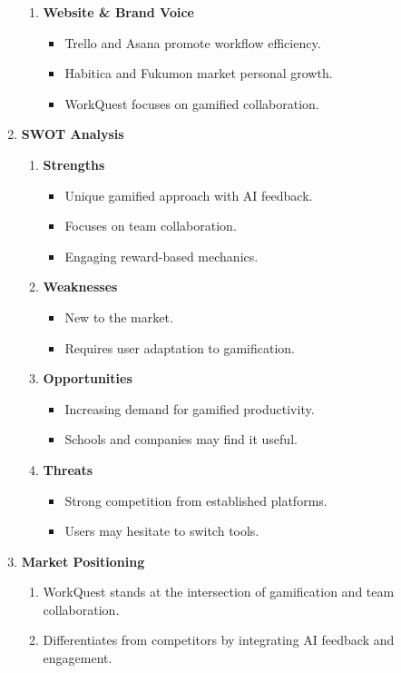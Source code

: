 \begin{enumerate}
\begin{enumerate}
        \item \textbf{Website \& Brand Voice}
        \begin{itemize}
            \item Trello and Asana promote workflow efficiency.
            \item Habitica and Fukumon market personal growth.
            \item WorkQuest focuses on gamified collaboration.
        \end{itemize}
    \end{enumerate}

    \item \textbf{SWOT Analysis}
    \begin{enumerate}
        \item \textbf{Strengths}
        \begin{itemize}
            \item Unique gamified approach with AI feedback.
            \item Focuses on team collaboration.
            \item Engaging reward-based mechanics.
        \end{itemize}
        
        \item \textbf{Weaknesses}
        \begin{itemize}
            \item New to the market.
            \item Requires user adaptation to gamification.
        \end{itemize}

        \item \textbf{Opportunities}
        \begin{itemize}
            \item Increasing demand for gamified productivity.
            \item Schools and companies may find it useful.
        \end{itemize}

        \item \textbf{Threats}
        \begin{itemize}
            \item Strong competition from established platforms.
            \item Users may hesitate to switch tools.
        \end{itemize}
    \end{enumerate}

    \item \textbf{Market Positioning}
    \begin{enumerate}
        \item WorkQuest stands at the intersection of gamification and team collaboration.
        \item Differentiates from competitors by integrating AI feedback and engagement.
    \end{enumerate}

\end{enumerate}

